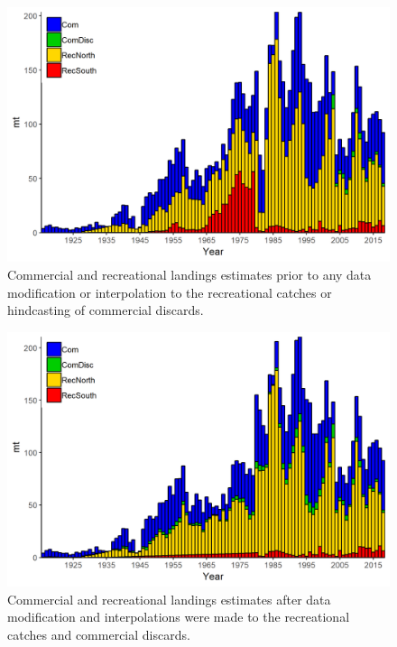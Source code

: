 \documentclass[12pt,]{article}
\begin{document}
\begin{figure}
\centering
\includegraphics{Figures/Catches_original.png}
\caption{Commercial and recreational landings estimates prior to any
data modification or interpolation to the recreational catches or
hindcasting of commercial discards. \label{fig:Catches_original}}
\end{figure}

\begin{figure}
\centering
\includegraphics{Figures/Catches_alternate.png}
\caption{Commercial and recreational landings estimates after data
modification and interpolations were made to the recreational catches
and commercial discards. \label{fig:Catches_alternate}}
\end{figure}

\FloatBarrier
\end{document}
